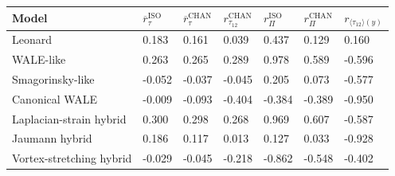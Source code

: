 \begin{tabular}{lllllll}
\toprule
Model & $\overline{r}_{\tau}^{\mathrm{ISO}}$ & $\overline{r}_{\tau}^{\mathrm{CHAN}}$ & $r_{\tau_{12}}^{\mathrm{CHAN}}$ & $r_{\Pi}^{\mathrm{ISO}}$ & $r_{\Pi}^{\mathrm{CHAN}}$ & $r_{\langle \tau_{12} \rangle (y)}$ \\
\midrule
Leonard & 0.183 & 0.161 & 0.039 & 0.437 & 0.129 & 0.160 \\
WALE-like & 0.263 & 0.265 & 0.289 & 0.978 & 0.589 & -0.596 \\
Smagorinsky-like & -0.052 & -0.037 & -0.045 & 0.205 & 0.073 & -0.577 \\
Canonical WALE & -0.009 & -0.093 & -0.404 & -0.384 & -0.389 & -0.950 \\
Laplacian-strain hybrid & 0.300 & 0.298 & 0.268 & 0.969 & 0.607 & -0.587 \\
Jaumann hybrid & 0.186 & 0.117 & 0.013 & 0.127 & 0.033 & -0.928 \\
Vortex-stretching hybrid & -0.029 & -0.045 & -0.218 & -0.862 & -0.548 & -0.402 \\
\bottomrule
\end{tabular}
